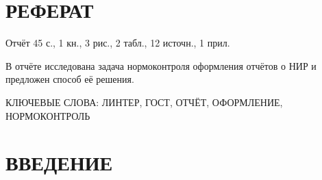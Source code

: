 \section*{РЕФЕРАТ}

Отчёт 45 с., 1 кн., 3 рис., 2 табл., 12 источн., 1 прил.

В отчёте исследована задача нормоконтроля оформления отчётов о НИР %
и предложен способ её решения.

КЛЮЧЕВЫЕ СЛОВА: ЛИНТЕР, ГОСТ, ОТЧЁТ, ОФОРМЛЕНИЕ, НОРМОКОНТРОЛЬ

\section*{ВВЕДЕНИЕ}
